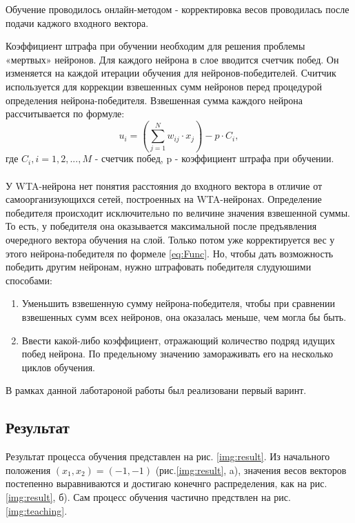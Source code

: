 Обучение проводилось онлайн-методом - корректировка весов проводилась после подачи каджого входного вектора.

Коэффициент штрафа при обучении необходим для решения проблемы «мертвых» нейронов. Для каждого нейрона в слое вводится счетчик побед. Он изменяется на каждой итерации обучения для нейронов-победителей. Считчик используется для коррекции взвешенных сумм нейронов перед процедурой определения нейрона-победителя. Взвешенная сумма каждого нейрона рассчитывается по формуле:
\begin{equation}\label{eq:penaltyFunc}
    u _ { i } = \left( \sum _ { j = 1 } ^ { N } w _ { i j } \cdot x _ { j } \right) - p \cdot C_i,
\end{equation}
где $C_i, i=1, 2, ..., M$ - счетчик побед, p - коэффициент штрафа при обучении.\\
~\\
  У WTA-нейрона нет понятия расстояния до входного вектора в отличие от самоорганизующихся сетей, построенных на WTA-нейронах. Определение победителя происходит исключительно по величине значения взвешенной суммы. То есть, у победителя она оказывается максимальной после предъявления очередного вектора обучения на слой. Только потом уже корректируется вес у этого нейрона-победителя по формеле \ref{eq:Func}. Но, чтобы дать возможность победить другим нейронам, нужно штрафовать победителя слудуюшими способами:

\begin{enumerate} 
  \item Уменьшить взвешенную сумму нейрона-победителя, чтобы при сравнении  взвешенных сумм всех нейронов, она оказалась меньше, чем могла бы быть.
  \item Ввести какой-либо коэффициент, отражающий количество подряд идущих побед нейрона. По предельному значению замораживать его на несколько циклов обучения.
\end{enumerate}
В рамках данной лаботароной работы был реализовани первый варинт.

\subsection{Результат}

Результат процесса обучения представлен на рис. \ref{img:result}. Из начального положения $(x_1, x_2) = (-1, -1)$ (рис.\ref{img:result}, a), значения весов векторов постепенно выравниваются и достигаю конечнго распределения, как на рис.\ref{img:result}, б). Сам процесс обучения частично предствлен на рис. \ref{img:teaching}.

